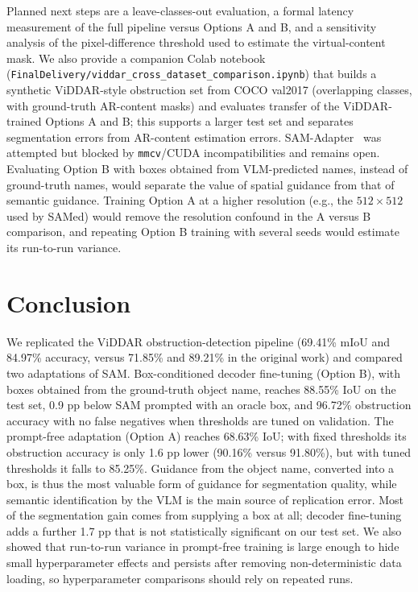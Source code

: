 \documentclass[conference]{IEEEtran}
\begin{document}
Planned next steps are a leave-classes-out evaluation, a formal latency measurement of the full pipeline versus Options A and B, and a sensitivity analysis of the pixel-difference threshold used to estimate the virtual-content mask. We also provide a companion Colab notebook (\texttt{FinalDelivery/viddar\_cross\_dataset\_comparison.ipynb}) that builds a synthetic ViDDAR-style obstruction set from COCO val2017 (overlapping classes, with ground-truth AR-content masks) and evaluates transfer of the ViDDAR-trained Options A and B; this supports a larger test set and separates segmentation errors from AR-content estimation errors. SAM-Adapter~\cite{samadapter} was attempted but blocked by \texttt{mmcv}/CUDA incompatibilities and remains open. Evaluating Option B with boxes obtained from VLM-predicted names, instead of ground-truth names, would separate the value of spatial guidance from that of semantic guidance. Training Option A at a higher resolution (e.g., the $512\times512$ used by SAMed) would remove the resolution confound in the A versus B comparison, and repeating Option B training with several seeds would estimate its run-to-run variance.


\section{Conclusion}

We replicated the ViDDAR obstruction-detection pipeline (69.41\% mIoU and 84.97\% accuracy, versus 71.85\% and 89.21\% in the original work) and compared two adaptations of SAM. Box-conditioned decoder fine-tuning (Option B), with boxes obtained from the ground-truth object name, reaches 88.55\% IoU on the test set, 0.9 pp below SAM prompted with an oracle box, and 96.72\% obstruction accuracy with no false negatives when thresholds are tuned on validation. The prompt-free adaptation (Option A) reaches 68.63\% IoU; with fixed thresholds its obstruction accuracy is only 1.6 pp lower (90.16\% versus 91.80\%), but with tuned thresholds it falls to 85.25\%. Guidance from the object name, converted into a box, is thus the most valuable form of guidance for segmentation quality, while semantic identification by the VLM is the main source of replication error. Most of the segmentation gain comes from supplying a box at all; decoder fine-tuning adds a further 1.7 pp that is not statistically significant on our test set. We also showed that run-to-run variance in prompt-free training is large enough to hide small hyperparameter effects and persists after removing non-deterministic data loading, so hyperparameter comparisons should rely on repeated runs.
\end{document}
